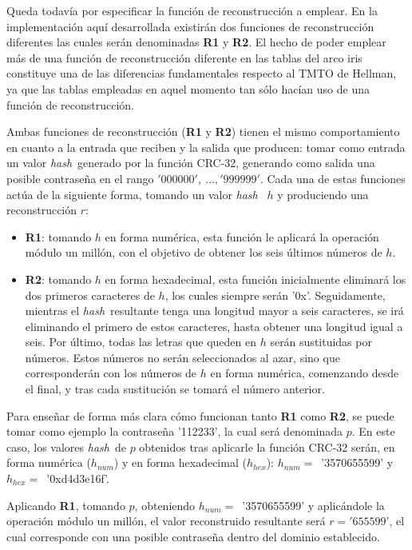 \documentclass[12pt,spanish,listoffigures,listoftables]{tfgetsinf}
\newcommand{\hash}{\textit{hash}}
\begin{document}
Queda todavía por especificar la función de reconstrucción a emplear. En la implementación aquí desarrollada existirán dos funciones de reconstrucción diferentes las cuales serán denominadas \textbf{R1} y \textbf{R2}. El hecho de poder emplear más de una función de reconstrucción diferente en las tablas del arco iris constituye una de las diferencias fundamentales respecto al TMTO de Hellman, ya que las tablas empleadas en aquel momento tan sólo hacían uso de una función de reconstrucción.

Ambas funciones de reconstrucción (\textbf{R1} y \textbf{R2}) tienen el mismo comportamiento en cuanto a la entrada que reciben y la salida que producen: tomar como entrada un valor \hash~generado por la función CRC-32, generando como salida una posible contraseña en el rango $'000000',~\dots, '999999'$. Cada una de estas funciones actúa de la siguiente forma, tomando un valor \hash~ $h$ y produciendo una reconstrucción $r$:

\begin{itemize}

    \item \textbf{R1}: tomando $h$ en forma numérica, esta función le aplicará la operación módulo un millón, con el objetivo de obtener los seis últimos números de $h$.
    
    \item \textbf{R2}: tomando $h$ en forma hexadecimal, esta función inicialmente eliminará los dos primeros caracteres de $h$, los cuales siempre serán '0x'. Seguidamente, mientras el \hash~resultante tenga una longitud mayor a seis caracteres, se irá eliminando el primero de estos caracteres, hasta obtener una longitud igual a seis. Por último, todas las letras que queden en $h$ serán sustituidas por números. Estos números no serán seleccionados al azar, sino que corresponderán con los números de $h$ en forma numérica, comenzando desde el final, y tras cada sustitución se tomará el número anterior.
    
\end{itemize}

Para enseñar de forma más clara cómo funcionan tanto \textbf{R1} como \textbf{R2}, se puede tomar como ejemplo la contraseña '112233', la cual será denominada $p$. En este caso, los valores \hash~de $p$ obtenidos tras aplicarle la función CRC-32 serán, en forma numérica ($h_{num}$) y en forma hexadecimal ($h_{hex}$): $h_{num} =$~'3570655599' y $h_{hex} =$~'0xd4d3e16f'.

Aplicando \textbf{R1}, tomando $p$, obteniendo $h_{num} =$~'3570655599' y aplicándole la operación módulo un millón, el valor reconstruido resultante será $r = '655599$', el cual corresponde con una posible contraseña dentro del dominio establecido.
\end{document}
